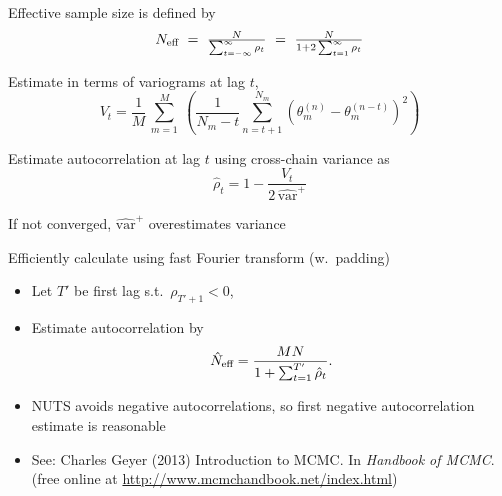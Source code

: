 \documentclass[10pt]{report}
\begin{document}
%
\begin{subitemize}
\item Effective sample size is defined by
\[\textstyle
N_{\mbox{\scriptsize eff}}
\ = \
\frac{N}{\sum_{t = -\infty}^{\infty} \rho_t}
\ = \
\frac{N}{1 + 2 \sum_{t = 1}^{\infty} \rho_t}
\]
\item Estimate in terms of variograms at lag $t$,
\[\textstyle
V_t =
\frac{1}{M}
\,
\sum_{m=1}^M
\
\left(
\frac{1}{N_m - t}
\sum_{n=t+1}^{N_m}
\left(
\theta_m^{(n)} - \theta_m^{(n-t)}
\right)^2
\right)
\]
\item Estimate autocorrelation at lag $t$ using cross-chain variance
  as
\[
\hat{\rho}_t
= 1 - \frac{\displaystyle V_t}{
            \displaystyle 2 \, \widehat{\mbox{var}}^{+}}
\]
\item If not converged, $\widehat{\mbox{var}}^{+}$ overestimates variance
\item Efficiently calculate using fast Fourier transform (w.\ padding)
\end{subitemize}


%
\begin{itemize}
\item Let $T'$ be first lag s.t.\ $\rho_{T' + 1} < 0$,
\item Estimate autocorrelation by
\[
\hat{N}_{\mbox{\scriptsize eff}}
=
\frac{MN}
     {1 + \sum_{t=1}^{T'} \hat{\rho}_t}.
\]
\item NUTS avoids negative autocorrelations, so first negative
  autocorrelation estimate is reasonable
\vfill
\item {\footnotesize See: Charles Geyer (2013) Introduction to MCMC. In
    {\slshape Handbook of MCMC}.
 (free online at \url{http://www.mcmchandbook.net/index.html})}
\end{itemize}
\end{document}
